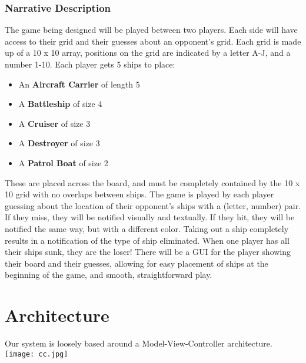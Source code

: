 \documentclass[10pt]{article}
\begin{document}
\section*{Narrative Description}
The game being designed will be played between two players.
Each side will have access to their grid and their guesses about an opponent's grid.
Each grid is made up of a 10 x 10 array, positions on the grid are indicated by a letter A-J, and a number 1-10.
Each player gets 5 ships to place:
\begin{itemize}
    \item An \textbf{Aircraft Carrier} of length 5
    \item A \textbf{Battleship} of size 4
    \item A \textbf{Cruiser} of size 3
    \item A \textbf{Destroyer} of size 3
    \item A \textbf{Patrol Boat} of size 2
\end{itemize}
These are placed across the board, and must be completely contained by the 10 x 10 grid with no overlaps between ships.
The game is played by each player guessing about the location of their opponent’s ships with a (letter, number) pair.
If they miss, they will be notified visually and textually.
If they hit, they will be notified the same way, but with a different color.
Taking out a ship completely results in a notification of the type of ship eliminated.
When one player has all their ships sunk, they are the loser!
There will be a GUI for the player showing their board and their guesses, allowing for easy placement of ships at the beginning of the game, and smooth, straightforward play. \\

\clearpage
\part*{Architecture}
Our system is loosely based around a Model-View-Controller architecture.\\
\texttt{[image: cc.jpg]}

\clearpage
\end{document}
